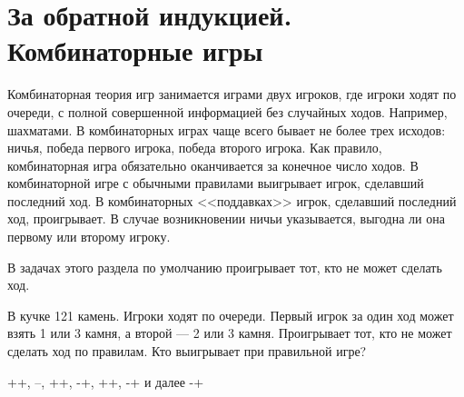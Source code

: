




\section{За обратной индукцией. Комбинаторные игры}


Комбинаторная теория игр занимается играми двух игроков, где игроки ходят по очереди, с полной совершенной информацией без случайных ходов. Например, шахматами. В комбинаторных играх чаще всего бывает не более трех исходов: ничья, победа первого игрока, победа второго игрока. Как правило, комбинаторная игра обязательно оканчивается за конечное число ходов. В комбинаторной игре с обычными правилами выигрывает игрок, сделавший последний ход. В комбинаторных <<поддавках>> игрок, сделавший последний ход, проигрывает. В случае возникновении ничьи указывается, выгодна ли она первому или второму игроку.

В задачах этого раздела по умолчанию проигрывает тот, кто не может сделать ход.





\begin{problem}\par
В кучке 121 камень. Игроки ходят по очереди. Первый игрок за один ход может взять 1 или 3 камня, а второй --- 2 или 3 камня. Проигрывает тот, кто не может сделать ход по правилам. Кто выигрывает при правильной игре?

\begin{sol}
 ++, --, ++, -+, ++, -+ и далее -+
\end{sol}
\end{problem}

